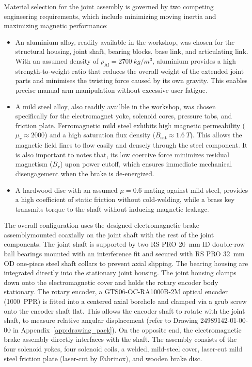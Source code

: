 Material selection for the joint assembly is governed by two competing engineering requirements, which include minimizing moving inertia and maximizing magnetic performance:
\begin{itemize}
	\item An aluminium alloy, readily available in the workshop,  was chosen for the structural housing, joint shaft, bearing blocks, base link, and articulating link. With an assumed density of $\rho_{\text{Al}} = \SI{2700}{kg/m^3}$, aluminium provides a high strength-to-weight ratio that reduces the overall weight of the extended joint parts and minimises the twisting force caused by its own gravity. This enables precise manual arm manipulation without excessive user fatigue.
	\item A mild steel alloy, also readily availble in the workshop, was chosen specifically for the electromagnet yoke, solenoid cores, pressure tabs, and friction plate. Ferromagnetic mild steel exhibits high magnetic permeability ($\mu_r \approx 2000$) and a high saturation flux density ($B_{\text{sat}} \approx \SI{1.6}{T}$). This allows the magnetic field lines to flow easily and densely through the steel component. It is also important to notes that, its low coercive force minimizes residual magnetism ($B_r$) upon power cutoff, which ensures immediate mechanical disengagement when the brake is de-energized.
	\item A hardwood disc with an assumed $\mu = 0.6$ mating against mild steel, provides a high coefficient of static friction without cold-welding, while a brass key transmits torque to the shaft without inducing magnetic leakage.
\end{itemize}

The overall configuration uses the designed electromagnetic brake assemblymounted coaxially on the joint shaft with the rest of the joint components. The joint shaft is supported by two RS PRO \SI{20}{mm} ID double-row ball bearings mounted with an interference fit and secured with RS PRO \SI{32}{mm} OD one-piece steel shaft collars to prevent axial slipping. The bearing housing are integrated directly into the stationary joint housing. The joint housing clamps down onto the electromagnetic cover and holds the rotary encoder body stationary. The rotary encoder, a GTS06-OC-RA1000B-2M optical encoder (\SI{1000}{PPR}) is fitted into a centered axial borehole and clamped via a grub screw onto the encoder shaft flat. This allows the encoder shaft to rotate with the joint shaft, to measure relative angular displacement (refer to Drawing 24989142-01-00-00 in Appendix~\ref{app:drawing_pack}). On the opposite end, the electromagnetic brake assembly directly interfaces with the shaft. The assembly consists of the four solenoid yokes, four solenoid coils, a welded, mild-steel cover, laser-cut mild steel friction plate (laser-cut by Fabrinox), and wooden brake disc.

